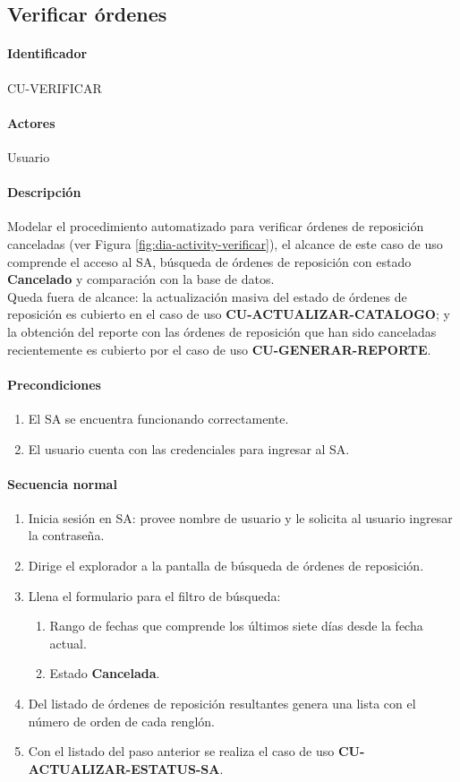 \subsection{Verificar órdenes}\label{cu-verificar}
\paragraph{Identificador}
CU-VERIFICAR
\paragraph{Actores}
Usuario
\paragraph{Descripción}
Modelar el procedimiento automatizado para verificar órdenes de reposición canceladas (ver Figura \ref{fig:dia-activity-verificar}), el alcance de este caso de uso comprende el acceso al SA, búsqueda de órdenes de reposición con estado \textbf{Cancelado} y comparación con la base de datos.\\
Queda fuera de alcance: la actualización masiva del estado de órdenes de reposición es cubierto en el caso de uso \textbf{CU-ACTUALIZAR-CATALOGO}; y la obtención del reporte con las órdenes de reposición que han sido canceladas recientemente es cubierto por el caso de uso \textbf{CU-GENERAR-REPORTE}.
\paragraph{Precondiciones}
\begin{enumerate}
  \item El SA se encuentra funcionando correctamente.
  \item El usuario cuenta con las credenciales para ingresar al SA.
\end{enumerate}
\paragraph{Secuencia normal}
\begin{enumerate}
  \item Inicia sesión en SA: provee nombre de usuario y le solicita al usuario ingresar la contraseña.
  \item Dirige el explorador a la pantalla de búsqueda de órdenes de reposición.
  \item Llena el formulario para el filtro de búsqueda:
  \begin{enumerate}
    \item Rango de fechas que comprende los últimos siete días desde la fecha actual.
    \item Estado \textbf{Cancelada}.
  \end{enumerate}
  \item Del listado de órdenes de reposición resultantes genera una lista con el número de orden de cada renglón.
  \item Con el listado del paso anterior se realiza el caso de uso \textbf{CU-ACTUALIZAR-ESTATUS-SA}.
\end{enumerate}
